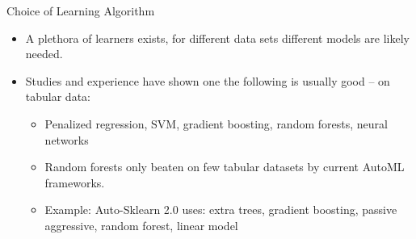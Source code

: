 \begin{frame}{Choice of Learning Algorithm}
  \begin{itemize}
    \item A plethora of learners exists, for different data sets different models
        are likely needed.
    \item Studies and experience have shown one the following 
        is usually good -- on tabular data:
    \begin{itemize}
      \item Penalized regression, SVM, gradient boosting, random forests, neural networks
      \item Random forests only beaten on few tabular datasets by current AutoML frameworks.
      \item Example: Auto-Sklearn 2.0 uses: extra trees, gradient boosting, passive aggressive, random forest, linear model
    \end{itemize}
  \end{itemize}
\end{frame}

